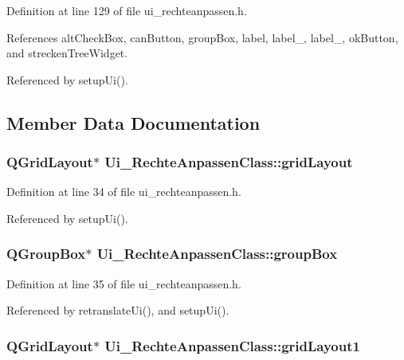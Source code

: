 Definition at line 129 of file ui\_\-rechteanpassen.h.

References altCheckBox, canButton, groupBox, label, label\_, label\_, okButton, and streckenTreeWidget.

Referenced by setupUi().

\subsection{Member Data Documentation}
\hypertarget{class_ui___rechte_anpassen_class_151fb27b02b218bb55b44172251221be}{
\subsubsection[gridLayout]{\setlength{\rightskip}{0pt plus 5cm}QGridLayout$\ast$ {\bf Ui\_\-RechteAnpassenClass::gridLayout}}}
\label{class_ui___rechte_anpassen_class_151fb27b02b218bb55b44172251221be}




Definition at line 34 of file ui\_\-rechteanpassen.h.

Referenced by setupUi().\hypertarget{class_ui___rechte_anpassen_class_c7b91f5a5d57a1d5202d0c11d6366c15}{
\subsubsection[groupBox]{\setlength{\rightskip}{0pt plus 5cm}QGroupBox$\ast$ {\bf Ui\_\-RechteAnpassenClass::groupBox}}}
\label{class_ui___rechte_anpassen_class_c7b91f5a5d57a1d5202d0c11d6366c15}




Definition at line 35 of file ui\_\-rechteanpassen.h.

Referenced by retranslateUi(), and setupUi().\hypertarget{class_ui___rechte_anpassen_class_473514c93998216fa30a45bbc276119c}{
\subsubsection[gridLayout1]{\setlength{\rightskip}{0pt plus 5cm}QGridLayout$\ast$ {\bf Ui\_\-RechteAnpassenClass::gridLayout1}}}
\label{class_ui___rechte_anpassen_class_473514c93998216fa30a45bbc276119c}




